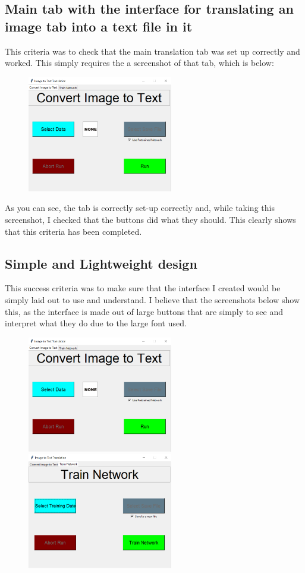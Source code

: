 \documentclass{report}
\begin{document}
\subsection{Main tab with the interface for translating an image tab into a text file in it}
This criteria was to check that the main translation tab was set up correctly and worked. This simply requires the a screenshot of that tab, which is below:
\begin{figure}[H]
    \centering
    \includegraphics[width=2.5in]{Images/Evaluation/Success Criteria Proof/Convert Image to Text Tab screenshot.png}
\end{figure}
\noindent As you can see, the tab is correctly set-up correctly and, while taking this screenshot, I checked that the buttons did what they should. This clearly shows that this criteria has been completed.
\subsection{Simple and Lightweight design}
This success criteria was to make sure that the interface I created would be simply laid out to use and understand. I believe that the screenshots below show this, as the interface is made out of large buttons that are simply to see and interpret what they do due to the large font used.
\begin{figure}[H]
    \centering
    \includegraphics[width=2.5in]{Images/Evaluation/Success Criteria Proof/Convert Image to Text Tab screenshot.png}
    \includegraphics[width=2.5in]{Images/Evaluation/Success Criteria Proof/Train Network Tab screenshot.png}
\end{figure}
\end{document}
